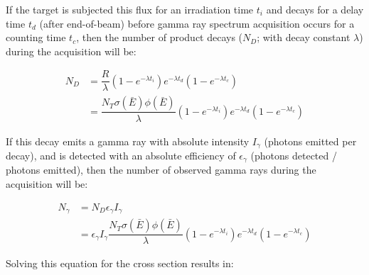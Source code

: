 \documentclass[5p]{elsarticle}
\newcommand{\pp}[1]{\left( #1\right)}
\begin{document}
If the target is subjected this flux  for an irradiation  time $t_i$ and decays for a  delay time $t_d$ (after end-of-beam) before gamma ray spectrum acquisition occurs for a counting time  $t_c$, then the number of product decays ($N_D$; with decay constant $\lambda$) during the acquisition will be:


\begin{align}
N_D &= \dfrac{R}{\lambda}\pp{1 - e^{-\lambda t_i}} e^{-\lambda t_d} \pp{1 - e^{-\lambda t_c}}
\\
&= \dfrac{N_T \sigma\pp{\bar{E}} \phi\pp{\bar{E}} }{\lambda}\pp{1 - e^{-\lambda t_i}} e^{-\lambda t_d} \pp{1 - e^{-\lambda t_c}} \nonumber
\end{align}


If this decay emits a gamma ray with absolute intensity $I_\gamma$ (photons emitted per decay), and is detected with an absolute efficiency  of $\epsilon_\gamma$ (photons detected / photons emitted), then the number of observed gamma rays during the acquisition will be:


 

\begin{align}
N_{\gamma} &= N_D \epsilon_\gamma I_\gamma \\
&=  \epsilon_\gamma I_\gamma  \dfrac{N_T \sigma\pp{\bar{E}} \phi\pp{\bar{E}} }{\lambda}\pp{1 - e^{-\lambda t_i}}  e^{-\lambda t_d} \pp{1 - e^{-\lambda t_c}} \nonumber
\end{align}

Solving this equation for the  cross section results in:
\end{document}
